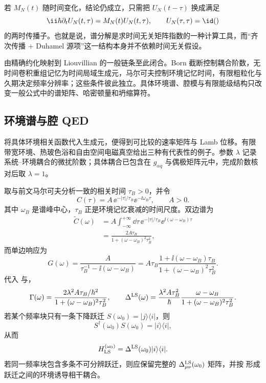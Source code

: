 若 $M_N(t)$ 随时间变化，结论仍成立，只需把 $U_N(t-\tau)$ 换成满足
\[
\ii\hbar\partial_tU_N(t,\tau)=M_N(t)U_N(t,\tau),
\qquad U_N(\tau,\tau)=\id()
\]
的两时传播子。也就是说，谱分解是求时间无关矩阵指数的一种计算工具，而“齐次传播 + Duhamel 源项”这一结构本身并不依赖时间无关假设。

由精确约化映射到 Liouvillian 的一般链条至此闭合。Born 截断控制耦合阶数，无时间卷积重组记忆为时间局域生成元，马尔可夫控制环境记忆时间，有限粗粒化与久期决定频率分辨率；这些条件彼此独立。具体环境谱、腔模与有限能级结构只改变一般公式中的谱矩阵、哈密顿量和坍缩算符。

\subsection{环境谱与腔 QED}
\label{sec:phys-oqs-bath-examples}

将具体环境相关函数代入生成元，便得到可比较的速率矩阵与 Lamb 位移。有限带宽环境、热玻色浴和自由空间电磁真空给出三种有代表性的例子。参数 $\lambda$ 记录系统--环境耦合的微扰阶数；具体耦合已包含在 $g_{\alpha q}$ 与偶极矩阵元中，完成阶数核对后取 $\lambda=1$。

\begin{exbox}[Lorentz 环境]
取与前文马尔可夫分析一致的相关时间 $\tau_B>0$，并令
\[
C(\tau)
=A\,\ee^{-|\tau|/\tau_B}
\ee^{-\ii\omega_B\tau},
\qquad A>0.
\]
其中 $\omega_B$ 是谱峰中心，$\tau_B$ 正是环境记忆衰减的时间尺度。双边谱为
\[
\begin{aligned}
\widetilde C(\omega)
&=A\int_{-\infty}^{+\infty}\dd\tau\,
\ee^{-|\tau|/\tau_B}
\ee^{\ii(\omega-\omega_B)\tau}\\
&=\frac{2A\tau_B}
{1+(\omega-\omega_B)^2\tau_B^2},
\end{aligned}
\]
而单边响应为
\[
G(\omega)
=\frac{A}{\tau_B^{-1}-\ii(\omega-\omega_B)}
=A\tau_B\frac{1+\ii(\omega-\omega_B)\tau_B}
{1+(\omega-\omega_B)^2\tau_B^2}.
\]
代入 与，
\[
\Gamma(\omega)
=\frac{2\lambda^2A\tau_B/\hbar^2}
{1+(\omega-\omega_B)^2\tau_B^2},
\qquad
\Delta^{\rm LS}(\omega)
=\frac{\lambda^2A\tau_B^2}{\hbar}
\frac{\omega-\omega_B}
{1+(\omega-\omega_B)^2\tau_B^2}.
\]
若某个频率块只有一条下降跃迁 $S(\omega_0)=|j\rangle\langle i|$，则
\[
S^\dagger(\omega_0)S(\omega_0)=|i\rangle\langle i|,
\]
从而
\begin{equation}
H_{\rm LS}^{(\omega_0)}
=\Delta^{\rm LS}(\omega_0)|i\rangle\langle i|.
\label{eq:phys-oqs-lorentzian-lamb-shift}
\end{equation}
若同一频率块包含多条不可分辨跃迁，则应保留完整的 $\Delta_{\mu\nu}^{\rm LS}(\omega_0)$ 矩阵，并按 形成跃迁之间的环境诱导相干耦合。
\end{exbox}

